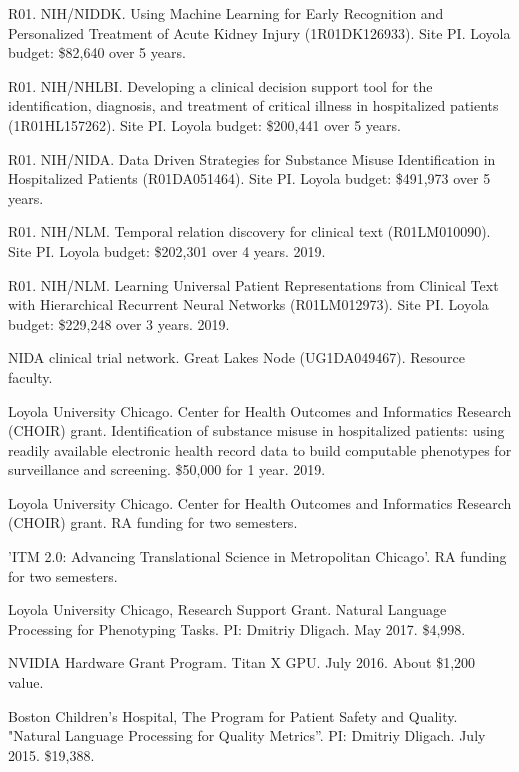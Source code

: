 \documentclass[letterpaper]{article}
\renewenvironment{itemize}{
  \begin{list}{}{
    \setlength{\leftmargin}{1.5em}
  }
}{
  \end{list}
}
\begin{document}
\begin{itemize}
\item R01. NIH/NIDDK. Using Machine Learning for Early Recognition and Personalized Treatment of Acute Kidney Injury (1R01DK126933). Site PI. Loyola budget: \$82,640 over 5 years.
\item R01. NIH/NHLBI. Developing a clinical decision support tool for the identification, diagnosis, and treatment of critical illness in hospitalized patients (1R01HL157262). Site PI. Loyola budget: \$200,441 over 5 years.
\item R01. NIH/NIDA. Data Driven Strategies for Substance Misuse Identification in Hospitalized Patients (R01DA051464). Site PI. Loyola budget: \$491,973 over 5 years.
\item R01. NIH/NLM. Temporal relation discovery for clinical text (R01LM010090). Site PI. Loyola budget: \$202,301 over 4 years. 2019.
\item R01. NIH/NLM. Learning Universal Patient Representations from Clinical Text with Hierarchical Recurrent Neural Networks (R01LM012973). Site PI. Loyola budget: \$229,248 over 3 years. 2019.
\item NIDA clinical trial network. Great Lakes Node (UG1DA049467). Resource faculty.
\item Loyola University Chicago. Center for Health Outcomes and Informatics Research (CHOIR) grant. Identification of substance misuse in hospitalized patients: using readily available electronic health record data to build computable phenotypes for surveillance and screening. \$50,000 for 1 year. 2019.
\item Loyola University Chicago. Center for Health Outcomes and Informatics Research (CHOIR) grant. RA funding for two semesters.
\item 'ITM 2.0: Advancing Translational Science in Metropolitan Chicago'. RA funding for two semesters.
\item Loyola University Chicago, Research Support Grant. Natural Language Processing for Phenotyping Tasks. PI: Dmitriy Dligach. May 2017. \$4,998.
\item NVIDIA Hardware Grant Program. Titan X GPU. July 2016. About \$1,200 value.
\item Boston Children's Hospital, The Program for Patient Safety and Quality. "Natural Language Processing for Quality Metrics''. PI: Dmitriy Dligach. July 2015. \$19,388.
\end{itemize}
\end{document}
